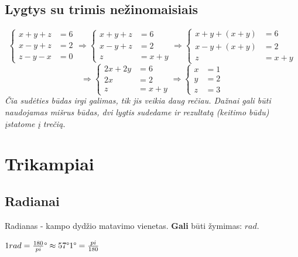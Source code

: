 \documentclass[fleqn]{article} %
\begin{document}
\subsection{Lygtys su trimis nežinomaisiais}
\begin{equation}
    \begin{cases}
        x + y + z &= 6 \\
        x - y + z &= 2 \\
        z - y - x &= 0
    \end{cases}
    \Rightarrow
    \begin{cases}
        x + y + z &= 6 \\
        x - y + z &= 2 \\
        z         &= x + y
    \end{cases}
    \Rightarrow
    \begin{cases}
        x + y + (x + y) &= 6 \\
        x - y + (x + y) &= 2 \\
        z &= x + y
    \end{cases}
\end{equation}
\begin{equation}
    \Rightarrow
    \begin{cases}
        2x + 2y &= 6 \\
        2x &= 2 \\
        z &= x + y
    \end{cases}
    \Rightarrow
    \begin{cases}
        x &= 1 \\
        y &= 2 \\
        z &= 3
    \end{cases}
\end{equation}
\textit{Čia sudėties būdas irgi galimas, tik jis veikia daug rečiau. Dažnai gali būti naudojamas mišrus būdas, dvi lygtis sudedame ir rezultatą (keitimo būdu) įstatome į trečią.}



\section{Trikampiai}

\subsection{Radianai}
Radianas - kampo dydžio matavimo vienetas. \textbf{Gali} būti žymimas: $rad$.

\begin{math} \\
    1rad = \frac{180}{pi}\degree \approx 57 \degree \\
    1\degree = \frac{pi}{180}
\end{math}
\end{document}
